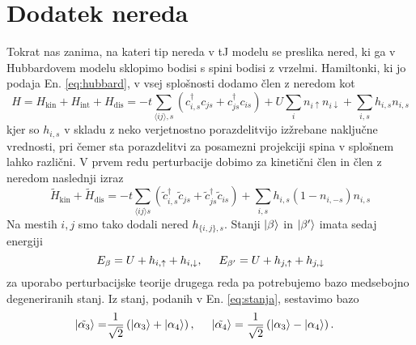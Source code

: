 \documentclass[10pt,a4paper]{article}
\begin{document}
\section{Dodatek nereda}
Tokrat nas zanima, na kateri tip nereda v tJ modelu se preslika nered, ki ga v Hubbardovem modelu sklopimo bodisi s spini bodisi z vrzelmi. Hamiltonki, ki jo podaja En. \eqref{eq:hubbard}, v vsej splošnosti dodamo člen z neredom kot 
\begin{equation}
H=H_\mathrm{kin} + H_\mathrm{int} + H_\mathrm{dis}=-t\sum\limits_{\langle ij \rangle, s}\left(c^\dagger_{i,s} c_{js} + c^\dagger_{js}c_{is}\right) + U\sum_i n_{i\uparrow}n_{i\downarrow} + \sum\limits_{i,s} h_{i,s} n_{i, s}  
\end{equation}
kjer so $h_{i,s}$ v skladu z neko verjetnostno porazdelitvijo izžrebane naključne vrednosti, pri čemer sta porazdelitvi za posamezni projekciji spina v splošnem lahko različni. V prvem redu perturbacije dobimo za kinetični člen in člen z neredom naslednji izraz
\begin{equation}
\tilde{H}_\mathrm{kin} + \tilde{H}_\mathrm{dis} = -t\sum\limits_{\langle ij \rangle s} \left(\tilde{c}^\dagger_{i,s} \tilde{c}_{js} + \tilde{c}^\dagger_{js}\tilde{c}_{is}\right) +\sum\limits_{i,s} h_{i,s} \left(1-n_{i,-s}\right)n_{i,s}
\end{equation}
Na mestih $i, j$ smo tako dodali nered $h_{\{i,j\},s}$. Stanji $\vert\beta\rangle$ in $\vert\beta'\rangle$ imata sedaj energiji 
\begin{equation}
E_\beta = U + h_{i,\uparrow} + h_{i,\downarrow}, \hspace{5mm} E_{\beta'}= U + h_{j, \uparrow} + h_{j,\downarrow} 
\end{equation}
za uporabo perturbacijske teorije drugega reda pa potrebujemo bazo medsebojno degeneriranih stanj. Iz stanj, podanih v En. \eqref{eq:stanja}, sestavimo bazo 
\begin{equation}
\begin{split}
\vert\tilde{\alpha_3}\rangle=&\frac{1}{\sqrt{2}}\left( \vert\alpha_3\rangle + \vert\alpha_4\rangle\right), \hspace{ 5mm}\vert\tilde{\alpha_4}\rangle=\frac{1}{\sqrt{2}}\left(\vert\alpha_3\rangle - \vert\alpha_4\rangle\right).
\end{split}
\end{equation}
\end{document}
